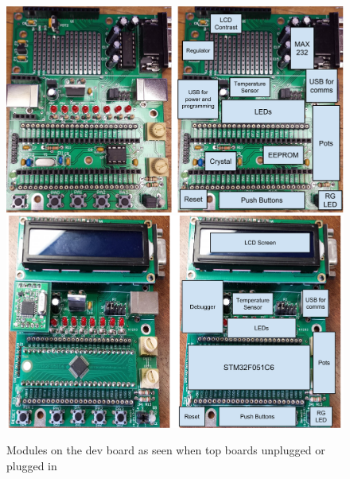 \begin{figure}
  \centering
  \includegraphics[width=\textwidth]{./week1/dev_board_unplugged.pdf}\\
  \vspace{3mm}
  \includegraphics[width=\textwidth]{./week1/dev_board_plugged_in.pdf}
  \caption{Modules on the dev board as seen when top boards unplugged or plugged in}
\end{figure}

